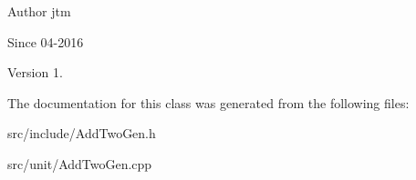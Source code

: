 \begin{DoxyAuthor}{Author}
jtm 
\end{DoxyAuthor}
\begin{DoxySince}{Since}
04-\/2016 
\end{DoxySince}
\begin{DoxyVersion}{Version}
1. 
\end{DoxyVersion}


The documentation for this class was generated from the following files\-:\begin{DoxyCompactItemize}
\item 
src/include/Add\-Two\-Gen.\-h\item 
src/unit/Add\-Two\-Gen.\-cpp\end{DoxyCompactItemize}
